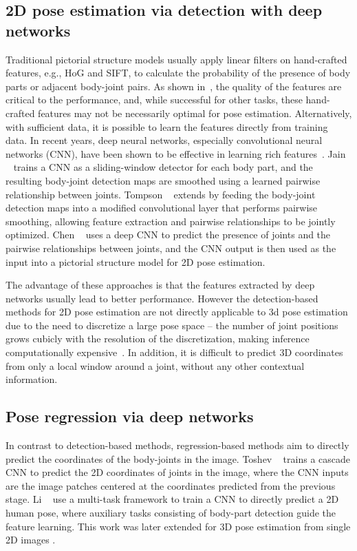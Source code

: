\documentclass[10pt,twocolumn,letterpaper]{article}
\begin{document}
\subsection{2D pose estimation via detection with deep networks}
Traditional pictorial structure models usually apply linear filters on hand-crafted features, e.g., HoG and SIFT, to calculate the probability of the presence of body parts or adjacent body-joint pairs.
As shown in~\cite{Eichner2009BMVC}, the quality of the features are critical to the performance, and, while successful for other tasks, these hand-crafted features may not be necessarily optimal for pose estimation.
Alternatively, with sufficient data, it is %
possible to learn the features directly from training data.
In recent years, deep neural networks, especially convolutional neural networks (CNN), have been shown to be effective in learning rich features~\cite{Ali2014, Alex2012}.
Jain \etal~\cite{arjun2014iclr} trains a CNN as a sliding-window detector for each body part, 
and the resulting body-joint detection maps are smoothed using a learned pairwise relationship between joints.
Tompson \etal~\cite{Jonathan2014} extends \cite{arjun2014iclr} by feeding the body-joint detection maps into a modified convolutional layer that performs pairwise smoothing, allowing  feature extraction and pairwise relationships to be jointly optimized.
Chen \etal~\cite{Chen_NIPS14}  uses a deep CNN to predict the presence of joints and the pairwise relationships between joints, and the CNN output is then used as the input into a pictorial structure model for 2D pose estimation.

The advantage of these approaches is that the features extracted by deep networks usually lead to better performance.
However the detection-based methods for 2D pose estimation are not directly applicable to 3d pose estimation %
due to the need to discretize a large pose space -- the number of joint positions grows cubicly with the resolution of the discretization, making inference computationally expensive~\cite{Burenius2013}.
In addition, it is difficult to predict 3D coordinates from only a local window around a joint, without any other contextual information.


 

\subsection{Pose regression via deep networks}

In contrast to detection-based methods, regression-based methods aim to directly predict the coordinates of the body-joints in the image.
Toshev \etal~\cite{deeppose2014} trains a cascade CNN to predict the 2D coordinates of joints in the image, where the CNN inputs are the image patches centered at the coordinates predicted from the previous stage.
Li \etal~\cite{hmlpeijcv} use a multi-task framework to train a CNN to directly predict a 2D human pose, where auxiliary tasks consisting of body-part detection guide the feature learning.
This work was later extended for 3D pose estimation from single 2D images  \cite{accv2014}.
\end{document}
